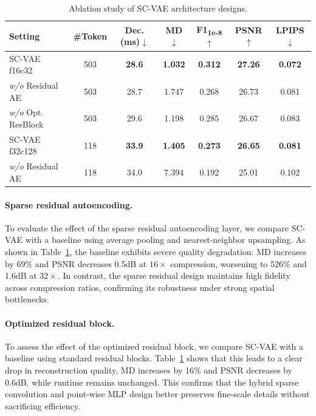 \documentclass[10pt,twocolumn,letterpaper]{article}
\newcommand{\paravspace}{\vspace{-11pt}}
\begin{document}
\begin{table}[t]  
	\centering  
	\scriptsize
    \caption{Ablation study of SC-VAE architecture designs.}  
    \vspace{-8pt}
	\renewcommand{\arraystretch}{1}
    \setlength{\tabcolsep}{2.5pt}
	\begin{tabular}{lcccccc}  
        \toprule
      \textbf{Setting} & \textbf{\#Token} & \textbf{Dec. {\tiny(ms)}$\downarrow$} & \textbf{MD$\downarrow$} & \textbf{F1\textsubscript{1e-8}$\uparrow$} & \textbf{PSNR$\uparrow$} & \textbf{LPIPS$\downarrow$}  \\  
		 \midrule  
		SC-VAE f16c32 & 503 & \textbf{28.6} & \textbf{1.032} & \textbf{0.312}  & \textbf{27.26} & \textbf{0.072} \\
		  \hspace{5px}\emph{w/o} Residual AE & 503 & 28.7 & 1.747 & 0.268 & 26.73 & 0.081 \\
        \hspace{5px}\emph{w/o} Opt. ResBlock & 503 & 29.6 & 1.198 & 0.285 & 26.67 & 0.083 \\
        \midrule
		SC-VAE f32c128 & 118 & \textbf{33.9} & \textbf{1.405} & \textbf{0.273} & \textbf{26.65} & \textbf{0.081} \\
		  \hspace{5px}\emph{w/o} Residual AE & 118 & 34.0 & 7.394 & 0.192 & 25.01 & 0.102 \\
		\bottomrule
	\end{tabular}  
    \vspace{-8pt}
	\label{tab:ablation}  
\end{table} 

\paravspace
\paragraph{Sparse residual autoencoding.}
To evaluate the effect of the sparse residual autoencoding layer, we compare SC-VAE with a baseline using average pooling and nearest-neighbor upsampling. As shown in Table~\ref{tab:ablation}, the baseline exhibits severe quality degradation: MD increases by 69\% and PSNR decreases 0.5dB at $16\times$ compression, worsening to 526\% and 1.6dB at $32\times$. In contrast, the sparse residual design maintains high fidelity across compression ratios, confirming its robustness under strong spatial bottlenecks.

\paravspace
\paragraph{Optimized residual block.}
To assess the effect of the optimized residual block, we compare SC-VAE with a baseline using standard residual blocks. Table~\ref{tab:ablation} shows that this leads to a clear drop in reconstruction quality, MD increases by 16\% and PSNR decreases by 0.6dB, while runtime remains unchanged. This confirms that the hybrid sparse convolution and point-wise MLP design better preserves fine-scale details without sacrificing efficiency.
\end{document}
